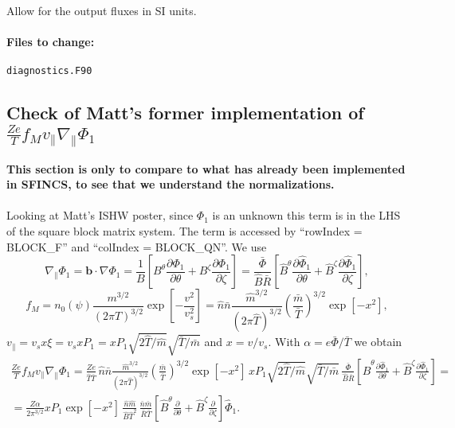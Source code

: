 \documentclass[12pt]{article}
\newcommand{\p}{\partial}
\newcommand{\na}{\nabla}
\begin{document}
\noindent Allow for the output fluxes in SI units.

\paragraph*{\textbf{Files to change:}}
\begin{verbatim}
diagnostics.F90
\end{verbatim}


\newpage
{}

\begin{appendices}
\section{Check of Matt's former implementation of $\displaystyle \frac{Z e}{T} f_M v_\| \na_\| \Phi_1$}
\textbf{This section is only to compare to what has already been implemented in SFINCS, to see that we understand the normalizations.}\\
\\
Looking at Matt's ISHW poster, since $\Phi_1$ is an unknown this term is in the LHS of the square block matrix system. 
The term is accessed by ``rowIndex = BLOCK\_F'' and ``colIndex = BLOCK\_QN''. 
We use
\[
\na_\| \Phi_1 = \bm{b} \cdot \na \Phi_1 = \frac{1}{B} \left[ B^{\theta} \frac{\p \Phi_1}{\p \theta} + B^{\zeta} \frac{\p \Phi_1}{\p \zeta} \right] = 
\frac{\bar{\Phi}}{\hat{B} \bar{R}} \left[ \hat{B}^{\theta} \frac{\p \hat{\Phi}_1}{\p \theta} + \hat{B}^{\zeta} \frac{\p \hat{\Phi}_1}{\p \zeta} \right], 
\]
\[
f_M = n_0\left(\psi\right) \frac{m^{3/2}}{\left(2 \pi T\right)^{3/2}} \exp \left[- \frac{v^2}{v_{s}^2}\right] = 
\hat{n} \bar{n} \frac{\hat{m}^{3/2}}{\left(2 \pi \hat{T}\right)^{3/2}} \left(\frac{\bar{m}}{\bar{T}}\right)^{3/2} \exp \left[- x^2\right],
\]
$v_\| = v_s x \xi = v_s x P_1 = x P_1 \sqrt{2 \hat{T} / \hat{m}} \sqrt{\bar{T} / \bar{m}} $ and $x = v / v_s$. 
With $\alpha = e \bar{\Phi} / \bar{T}$ we obtain 
\begin{multline}
\frac{Z e}{T} f_M v_\| \na_\| \Phi_1 = \frac{Z e}{\hat{T} \bar{T}} \, \hat{n} \bar{n} \frac{\hat{m}^{3/2}}{\left(2 \pi \hat{T}\right)^{3/2}} \left(\frac{\bar{m}}{\bar{T}}\right)^{3/2} \exp \left[- x^2\right] \, x P_1 \sqrt{2 \hat{T} / \hat{m}} \sqrt{\bar{T} / \bar{m}} \, \frac{\bar{\Phi}}{\hat{B} \bar{R}} \left[ \hat{B}^{\theta} \frac{\p \hat{\Phi}_1}{\p \theta} + \hat{B}^{\zeta} \frac{\p \hat{\Phi}_1}{\p \zeta} \right] = \\ =
 \frac{Z \alpha}{2\pi^{3/2} } x P_1  \exp \left[- x^2\right] \, \frac{\hat{n} \hat{m}}{\hat{B} \hat{T}^2 }  \, \frac{\bar{n} \bar{m}}{\bar{R} \bar{T}} \left[ \hat{B}^{\theta} \frac{\p }{\p \theta} + \hat{B}^{\zeta} \frac{\p }{\p \zeta} \right] \hat{\Phi}_1.
\label{eq:TermNaParallelPhi1}
\end{multline}


\end{appendices}
\end{document}
